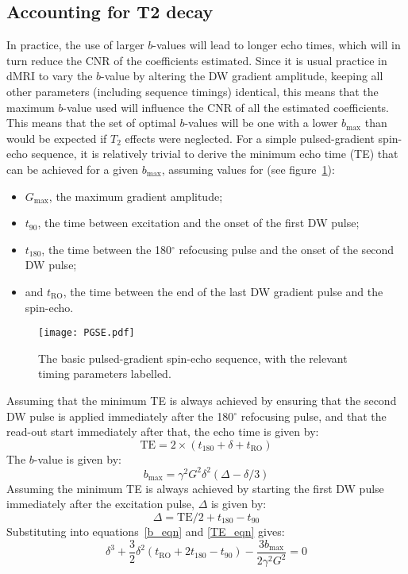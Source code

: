 \documentclass{article}
\begin{document}
\subsection{Accounting for T2 decay}

In practice, the use of larger $b$-values will lead to longer echo times, which will
in turn reduce the CNR of the coefficients estimated. Since it is usual
practice in dMRI to vary the $b$-value by altering the DW gradient amplitude,
keeping all other parameters (including sequence timings) identical, this means
that the maximum $b$-value used will influence the CNR of all the estimated
coefficients. This means that the set of optimal $b$-values will be one with a
lower $b_{\textrm{max}}$ than would be expected if $T_2$ effects were
neglected. For a simple pulsed-gradient spin-echo sequence, it is relatively
trivial to derive the minimum echo time (TE) that can be achieved for a given
$b_{\textrm{max}}$, assuming values for (see figure~\ref{PGSE}):
\begin{itemize}
\item $G_{\textrm{max}}$, the maximum gradient amplitude;
\item $t_{\textrm{90}}$, the time between excitation and the onset of the first DW
pulse;
\item $t_{\textrm{180}}$, the time between the 180$^\circ$ refocusing pulse and
the onset of the second DW pulse;
\item and $t_{\textrm{RO}}$, the time between the end
of the last DW gradient pulse and the spin-echo.
\end{itemize}

\begin{figure}[btp]
\centering
\texttt{[image: PGSE.pdf]} 
\caption{The basic pulsed-gradient spin-echo sequence, with the relevant timing parameters labelled.}
\label{PGSE}
\end{figure}

Assuming that the minimum TE is always achieved by ensuring that the second DW 
pulse is applied immediately after the 180$^\circ$ refocusing pulse, and that 
the read-out start immediately after that, the echo time is given by:
\begin{equation}
\label{TE_eqn}
\textrm{TE} = 2 \times ( t_{180} + \delta + t_{\textrm{RO}} )
\end{equation}
The $b$-value is given by:
\begin{equation}
\label{b_eqn}
b_{\textrm{max}} = \gamma^2 G^2 \delta^2 (\Delta - \delta/3)
\end{equation}
Assuming the minimum TE is always achieved by starting the first DW pulse 
immediately after the excitation pulse, $\Delta$ is given by:
\begin{equation}
\Delta = \textrm{TE}/2 + t_{180} - t_{90}
\end{equation}
Substituting into equations~\ref{b_eqn} and \ref{TE_eqn} gives:
\begin{equation}
\delta^3 + \frac{3}{2} \delta^2 (t_{\textrm{RO}} + 2 t_{180} - t_{90}) - \frac{3 b_{\textrm{max}}}{2\gamma^2 G^2} = 0
\end{equation}
\end{document}
